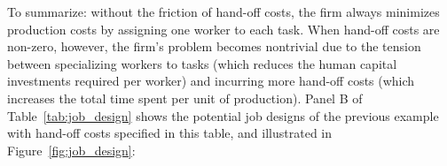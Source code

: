 \documentclass{article}
\theoremstyle{plain}
\theoremstyle{plain}
\begin{document}
To summarize: without the friction of hand-off costs, the firm always minimizes production costs by assigning one worker to each task.
When hand-off costs are non-zero, however, the firm's problem becomes nontrivial due to the tension between specializing workers to tasks (which reduces the human capital investments required per worker) and incurring more hand-off costs (which increases the total time spent per unit of production).
Panel B of Table~\ref{tab:job_design} shows the potential job designs of the previous example with hand-off costs specified in this table, and illustrated in Figure~\ref{fig:job_design}:
\end{document}
